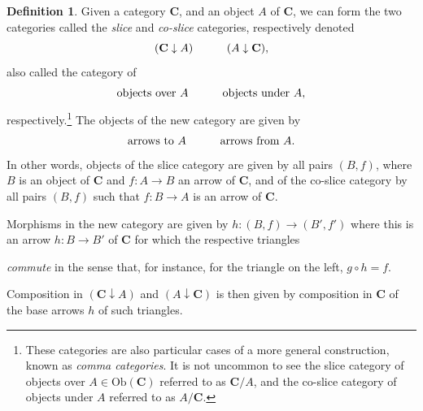 \documentclass[a4paper]{book}
\theoremstyle{definition}
\theoremstyle{definition}
\newtheorem{definition}{Definition}[section]
\theoremstyle{definition}
\theoremstyle{theorem}
\theoremstyle{definition}
\begin{document}
		\begin{definition}
			Given a category $\textbf{C}$, and an object $A$ of $\textbf{C}$, we can form the two categories called the \textit{slice} and \textit{co-slice} categories,   respectively denoted 
			\begin{equation*}
			(\textbf{C} \downarrow A) \hspace*{3em} (A \downarrow \textbf{C}),
			\end{equation*}
			also called the category of
			\begin{equation*} 
			\text{objects over } A \hspace*{3em} \text{objects under } A,
			\end{equation*}  
			respectively.\footnote{These categories are also particular cases of a more general construction, known as \textit{comma categories}. It is not uncommon to see the slice category of objects over $A \in \text{Ob}(\textbf{C})$ referred to as $\textbf{C} / A$, and the co-slice category of objects under $A$ referred to as $A / \textbf{C}$.} The objects of the new category are given by 
			\begin{equation*}
				\text{arrows to } A \hspace*{3em} \text{arrows from } A.
			\end{equation*}  
			In other words, objects of the slice category are given by all pairs $(B, f)$, where $B$ is an object of $\textbf{C}$ and $f: A \rightarrow B$ an arrow of $\textbf{C}$, and of the co-slice category by all pairs $(B, f)$ such that $f: B \rightarrow A$ is an arrow of $\textbf{C}$. \par 
			Morphisms in the new category are given by $h: (B, f) \rightarrow (B', f')$ where this is an arrow $h: B \rightarrow B'$ of $\textbf{C}$ for which the respective triangles 
				\begin{center}
				\end{center} 
				\par \noindent 
				\textit{commute} in the sense that, for instance, for the triangle on the left, $g \circ h = f$. \par 
			Composition in $(\textbf{C} \downarrow A)$ and $(A \downarrow \textbf{C})$ is then given by composition in $\textbf{C}$ of the base arrows $h$ of such triangles.  
		\end{definition}  
\end{document}

